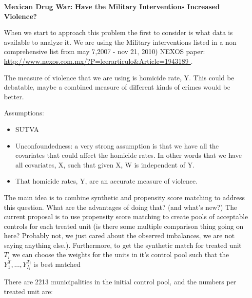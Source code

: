 \documentclass{article}[11 pt]
\begin{document}
\begin{center}	
	\textbf{Mexican Drug War: Have the Military Interventions Increased Violence?}
\end{center}

When we start to approach this problem the first to consider is what data is available to analyze it. We are using the Military interventions listed in a non comprehensive list from may 7,2007 - nov 21, 2010) NEXOS paper: \url{http://www.nexos.com.mx/?P=leerarticulo&Article=1943189 }. %

The measure of violence that we are using is homicide rate, Y. This could be debatable, maybe a combined measure of different kinds of crimes would be better.

Assumptions:
\begin{itemize}
	\item SUTVA
	\item Unconfoundedness: a very strong assumption is that we have all the covariates that could affect the homicide rates. In other words that we have all covariates, X, such that given X,  W is independent of Y.
	\item That homicide rates, Y, are an accurate measure of violence. 
\end{itemize}

The main idea is to combine synthetic and propensity score matching to address this question. What are the advantages of doing that? (and what's new?)
The current proposal is to use propensity score matching to create pools of acceptable controls for each treated unit (is there some multiple comparison thing going on here? Probably not, we just cared about the observed imbalances, we are not saying anything else.). Furthermore, to get the synthetic match for treated unit $T_i$ we can choose the weights for the units in it's control pool such that the $Y_1^T,\ldots, Y_{I_i}^{T_i}$ is best matched
	

There are 2213 municipalities in the initial control pool, and the numbers per treated unit are:
% 
\end{document}
